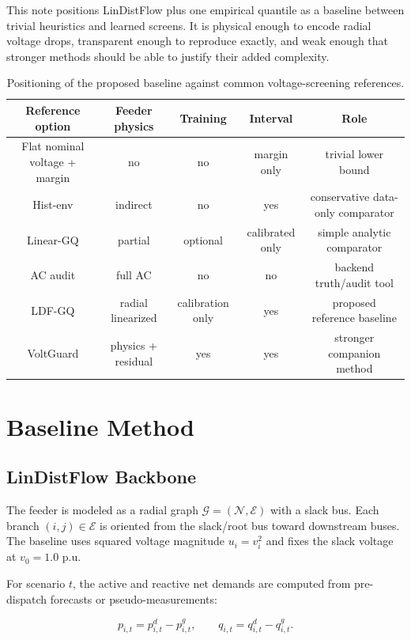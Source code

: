 \documentclass[
  journal]{IEEEtran}
\begin{document}
This note positions LinDistFlow plus one empirical quantile as a
baseline between trivial heuristics and learned screens. It is physical
enough to encode radial voltage drops, transparent enough to reproduce
exactly, and weak enough that stronger methods should be able to justify
their added complexity.

\begin{table}[t]
\centering
\caption{Positioning of the proposed baseline against common voltage-screening references.}
\label{tab:baseline_positioning}
\begin{tabular}{ccccc}
\hline
Reference option & Feeder physics & Training & Interval & Role \\
\hline
Flat nominal voltage + margin & no & no & margin only & trivial lower bound \\
Hist-env & indirect & no & yes & conservative data-only comparator \\
Linear-GQ & partial & optional & calibrated only & simple analytic comparator \\
AC audit & full AC & no & no & backend truth/audit tool \\
LDF-GQ & radial linearized & calibration only & yes & proposed reference baseline \\
VoltGuard & physics + residual & yes & yes & stronger companion method \\
\hline
\end{tabular}
\end{table}

\section{Baseline Method}\label{baseline-method}

\subsection{LinDistFlow Backbone}\label{lindistflow-backbone}

The feeder is modeled as a radial graph
\(\mathcal{G}=(\mathcal{N},\mathcal{E})\) with a slack bus. Each branch
\((i,j)\in\mathcal{E}\) is oriented from the slack/root bus toward
downstream buses. The baseline uses squared voltage magnitude
\(u_i=v_i^2\) and fixes the slack voltage at \(v_0=1.0\) p.u.

For scenario \(t\), the active and reactive net demands are computed
from pre-dispatch forecasts or pseudo-measurements:

\[
p_{i,t}=p^d_{i,t}-p^g_{i,t}, \qquad
q_{i,t}=q^d_{i,t}-q^g_{i,t}.
\]
\end{document}
